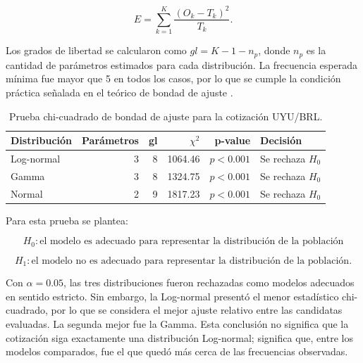 \[
    E = \sum_{k=1}^{K} \frac{(O_k - T_k)^2}{T_k}.
\]

Los grados de libertad se calcularon como \(gl = K - 1 - n_p\), donde \(n_p\) es la cantidad de parámetros estimados para cada distribución. La frecuencia esperada mínima fue mayor que 5 en todos los casos, por lo que se cumple la condición práctica señalada en el teórico de bondad de ajuste \cite{curso_bondad}.

\begin{table}[H]
\centering
\small
\caption{Prueba chi-cuadrado de bondad de ajuste para la cotización UYU/BRL.}
\label{tab:bondad-chi2}
\begin{tabular}{lrrrrl}
\toprule
Distribución & Parámetros & gl & \(\chi^2\) & p-value & Decisión \\
\midrule
Log-normal & 3 & 8 & 1064.46 & \(p<0.001\) & Se rechaza \(H_0\) \\
Gamma & 3 & 8 & 1324.75 & \(p<0.001\) & Se rechaza \(H_0\) \\
Normal & 2 & 9 & 1817.23 & \(p<0.001\) & Se rechaza \(H_0\) \\
\bottomrule
\end{tabular}
\end{table}

Para esta prueba se plantea:

\[
H_0: \text{el modelo es adecuado para representar la distribución de la población}
\]

\[
H_1: \text{el modelo no es adecuado para representar la distribución de la población}.
\]

Con \(\alpha=0.05\), las tres distribuciones fueron rechazadas como modelos adecuados en sentido estricto. Sin embargo, la Log-normal presentó el menor estadístico chi-cuadrado, por lo que se considera el mejor ajuste relativo entre las candidatas evaluadas. La segunda mejor fue la Gamma. Esta conclusión no significa que la cotización siga exactamente una distribución Log-normal; significa que, entre los modelos comparados, fue el que quedó más cerca de las frecuencias observadas.

